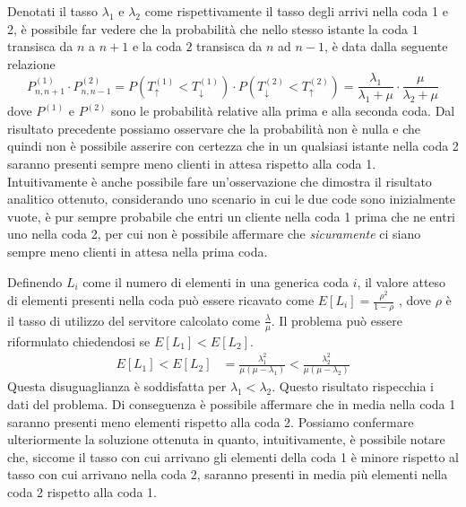 \documentclass{homework}
\begin{document}
Denotati il tasso $\lambda_1$ e $\lambda_2$ come rispettivamente il tasso degli arrivi nella coda 1 e 2, è possibile far vedere che la probabilità che nello stesso istante la coda $1$ transisca da $n$ a $n+1$ e la coda $2$ transisca da $n$ ad $n-1$, è data dalla seguente relazione
\[
P^{(1)}_{n,n+1} \cdot P^{(2)}_{n,n-1} = P(T_{\uparrow}^{(1)} < T_{\downarrow}^{(1)}) \cdot P(T_{\downarrow}^{(2)} < T_{\uparrow}^{(2)}) = \frac{\lambda_1}{\lambda_1 + \mu} \cdot \frac{\mu}{\lambda_2 + \mu}
\]
dove $P^{(1)}$ e $P^{(2)}$ sono le probabilità relative alla prima e alla seconda coda. Dal risultato precedente possiamo osservare che la probabilità non è nulla e che quindi non è possibile asserire con certezza che in un qualsiasi istante nella coda 2 saranno presenti sempre meno clienti in attesa rispetto alla coda 1.  \\
Intuitivamente è anche possibile fare un'osservazione che dimostra il risultato analitico ottenuto, considerando uno scenario in cui le due code sono inizialmente vuote, è pur sempre probabile che entri un cliente nella coda 1 prima che ne
entri uno nella coda 2, per cui non è possibile affermare che \emph{sicuramente} ci siano sempre meno clienti in attesa nella prima coda. 

\exercise*[4.b]
Definendo $L_i$ come il numero di elementi in una generica coda $i$, il valore atteso di elementi presenti nella coda può essere ricavato come $E[L_i] = \frac{\rho^2}{1 - \rho}$ \cite{ross}, dove $\rho$ è il tasso di utilizzo del servitore calcolato come $\frac{\lambda}{\mu}$. 
Il problema può essere riformulato chiedendosi se $E[L_1] < E[L_2]$. 
\begin{align*}
E[L_1] < E[L_2] &=  \frac{\lambda_1^2}{\mu(\mu - \lambda_1)} <  \frac{\lambda_2^2}{\mu(\mu - \lambda_2)}
\end{align*}
Questa disuguaglianza è soddisfatta per $\lambda_1 < \lambda_2$. Questo risultato rispecchia i dati del problema. Di conseguenza è possibile affermare che in media nella coda 1 saranno presenti meno elementi rispetto alla coda 2.
Possiamo confermare ulteriormente la soluzione ottenuta in quanto, intuitivamente, è possibile notare che, siccome il tasso con cui arrivano gli elementi della coda 1 è minore rispetto al tasso con cui arrivano nella coda 2, saranno presenti in media più elementi nella coda 2 rispetto alla coda 1.
\end{document}
